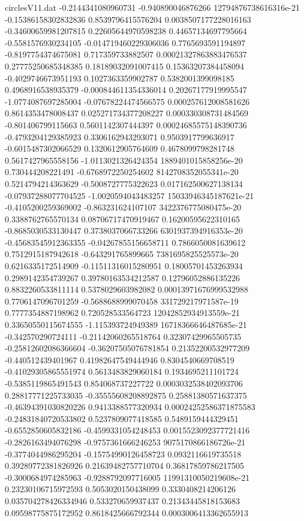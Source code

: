 \begin{filecontents}{circlesV11.dat}
-0.2144341080960731	-0.940890046876266	12794876738616316e-21
-0.15386158302832836	0.8539796415576204	0.0038507177228016163
-0.34600659981207815	0.22605644970598238	0.44657134697795664
-0.5581576930234105	-0.014719460229306036	0.7765693591194897
-0.8197754374675081	0.717359733882507	0.00021327863883476537
0.27775250685348385	0.18189032091007415	0.15363207384458094
-0.4029746673951193	0.1027363359902787	0.5382001399098185
0.4968916538935379	-0.000844611354336014	0.20267177919995547
-1.0774087697285004	-0.07678224474566575	0.000257612008581626
0.8614353478008437	0.025271734377208227	0.000330308731484569
-0.801406799115663	0.5601142307444397	0.00024685575148390736
-0.4793204129385923	0.3306162943293071	0.9503917799636917
-0.6015487302066529	0.1320612905764609	0.4678099798281748
0.5617427965558156	-1.0113021326424354	1889401015858256e-20
0.730444208221491	-0.6768972250254602	8142708352055341e-20
0.5214794214363629	-0.5008727775322623	0.017162500627138134
-0.07937288077704525	-1.0020594043483257	15033946345187621e-21
-0.4105200259369002	-0.863231624107107	3422376775080475e-20
0.3388762765570134	0.08706717470919467	0.16200595622310165
-0.8685030533130447	0.3738037066733266	6301937394916353e-20
-0.45683545912363355	-0.04267855156658711	0.7866050081639612
0.7512915187942618	-0.643291765899665	7381695825525573e-20
0.6216335172514909	-0.11511316015280951	0.18005701453263934
0.2989142354739267	0.39780163534212587	0.12796052886135226
0.8832260533811114	0.5378029603982082	0.00013971676999532988
0.7706147096701259	-0.5688688999070458	331729217971587e-19
0.7777354887198962	0.720528533564723	12042852934913559e-21
0.33650550115674555	-1.115393724949389	16718366646487685e-21
-0.342570290724111	-0.21142060265518764	0.32307429965505735
-0.25812602086366604	-0.36207505076781854	0.21352200532977209
-0.440512439401967	0.41982647549444946	0.8304540669708519
-0.41029305865551974	0.5613483829060184	0.1934695211101724
-0.5385119865491543	0.854068737227722	0.0003032538402093706
0.28817771225733035	-0.35555608208892875	0.25881380571637375
-0.46394391030820226	0.9413388577320934	0.00024252586371875583
-0.24831840720533802	0.5237809077418585	0.5489159444329451
-0.6552850605832186	-0.4599331054248453	0.0015523092377721416
-0.2826163494076298	-0.9757361666246253	9075170866186726e-21
-0.3774044986295204	-0.15754990126458723	0.0932116619735518
0.39289772381826926	0.21639482757710704	0.36817859786217505
-0.3000684974285963	-0.9288792097716005	11991310050219608e-21
0.23230106715972593	0.5053020150438099	0.3330408214206126
0.035704278426334946	0.533270659937437	0.21343445818153683
0.09598775875172952	0.8618425666792344	0.0003006413362655913

\end{filecontents}
